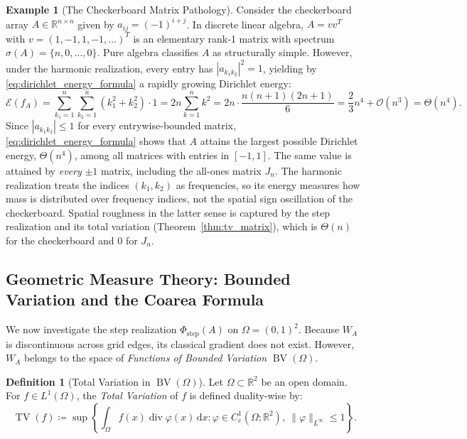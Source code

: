 \documentclass[11pt,a4paper,reqno]{amsart}
\theoremstyle{definition}
\newtheorem{definition}[theorem]{Definition}
\newtheorem{example}[theorem]{Example}
\numberwithin{equation}{section}
\providecommand{\R}{\mathbb{R}}
\providecommand{\BV}{\operatorname{BV}}
\providecommand{\TV}{\operatorname{TV}}
\newcommand{\dif}{\,\mathrm{d}}
\begin{document}
\begin{example}[The Checkerboard Matrix Pathology]
Consider the checkerboard array $A \in \R^{n \times n}$ given by $a_{ij} = (-1)^{i+j}$. In discrete linear algebra, $A = v v^T$ with $v = (1, -1, 1, -1, \dots)^T$ is an elementary rank-1 matrix with spectrum $\sigma(A) = \{n, 0, \dots, 0\}$. Pure algebra classifies $A$ as structurally simple. However, under the harmonic realization, every entry has $|a_{k_1 k_2}|^2 = 1$, yielding by \eqref{eq:dirichlet_energy_formula} a rapidly growing Dirichlet energy:
\begin{equation}
    \mathcal{E}(f_A) = \sum_{k_1=1}^n \sum_{k_2=1}^n (k_1^2 + k_2^2) \cdot 1 = 2n \sum_{k=1}^n k^2 = 2n \cdot \frac{n(n+1)(2n+1)}{6} = \frac{2}{3} n^4 + \mathcal{O}(n^3) = \Theta(n^4).
\end{equation}
Since $|a_{k_1 k_2}| \le 1$ for every entrywise-bounded matrix, \eqref{eq:dirichlet_energy_formula} shows that $A$ attains the largest possible Dirichlet energy, $\Theta(n^4)$, among all matrices with entries in $[-1,1]$. The same value is attained by \emph{every} $\pm 1$ matrix, including the all-ones matrix $J_n$. The harmonic realization treats the indices $(k_1,k_2)$ as frequencies, so its energy measures how mass is distributed over frequency indices, not the spatial sign oscillation of the checkerboard. Spatial roughness in the latter sense is captured by the step realization and its total variation (Theorem~\ref{thm:tv_matrix}), which is $\Theta(n)$ for the checkerboard and $0$ for $J_n$.
\end{example}

\subsection{Geometric Measure Theory: Bounded Variation and the Coarea Formula}
\label{subsec:coarea}

We now investigate the step realization $\Phi_{\mathrm{step}}(A)$ on $\Omega = (0, 1)^2$. Because $W_A$ is discontinuous across grid edges, its classical gradient does not exist. However, $W_A$ belongs to the space of \emph{Functions of Bounded Variation} $\BV(\Omega)$.

\begin{definition}[Total Variation in $\BV(\Omega)$]
Let $\Omega \subset \R^2$ be an open domain. For $f \in L^1(\Omega)$, the \emph{Total Variation} of $f$ is defined duality-wise by:
\begin{equation}
    \TV(f) \coloneqq \sup \left\{ \int_\Omega f(x) \operatorname{div} \varphi(x) \dif x \colon \varphi \in C_c^1(\Omega; \R^2), \ \|\varphi\|_{L^\infty} \le 1 \right\}.
\end{equation}
\end{definition}
\end{document}

